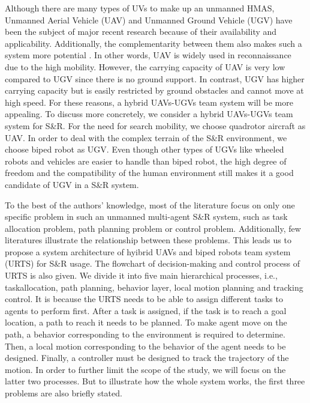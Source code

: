 \documentclass{ieeeaccess}
\begin{document}
Although there are many types of UVs to make up an unmanned HMAS, Unmanned Aerial Vehicle (UAV) and Unmanned Ground Vehicle (UGV) have been the subject of major recent research because of their availability and applicability. Additionally, the complementarity between them also makes such a system more potential \cite{arbanas2018decentralized}. In other words, UAV is widely used in reconnaissance due to the high mobility. However, the carrying capacity of UAV is very low compared to UGV since there is no ground support. In contrast, UGV has higher carrying capacity but is easily restricted by ground obstacles and cannot move at high speed. For these reasons, a hybrid UAVs-UGVs team system will be more appealing. To discuss more concretely, we consider a hybrid UAVs-UGVs team system for S\&R. For the need for search mobility, we choose quadrotor aircraft as UAV. In order to deal with the complex terrain of the S\&R environment, we choose biped robot as UGV. Even though other types of UGVs like wheeled robots and vehicles are easier to handle than biped robot, the high degree of freedom and the compatibility of the human environment still makes it a good candidate of UGV in a S\&R system.

To the best of the authors' knowledge, most of the literature focus on only one specific problem in such an unmanned multi-agent S\&R system, such as task allocation problem, path planning problem or control problem. Additionally, few literatures illustrate the relationship between these problems. This leads us to propose a system architecture of hyibrid UAVs and biped robots team system (URTS) for S\&R usage. The flowchart of decision-making and control process of URTS is also given. We divide it into five main hierarchical processes, i.e., taskallocation, path planning, behavior layer, local motion planning and tracking control. It is because the URTS needs to be able to assign different tasks to agents to perform first. After a task is assigned, if the task is to reach a goal location, a path to reach it needs to be planned. To make agent move on the path, a behavior corresponding to the environment is required to determine. Then, a local motion corresponding to the behavior of the agent needs to be designed. Finally, a controller must be designed to track the trajectory of the motion. In order to further limit the scope of the study, we will focus on the latter two processes. But to illustrate how the whole system works, the first three problems are also briefly stated.
\end{document}
